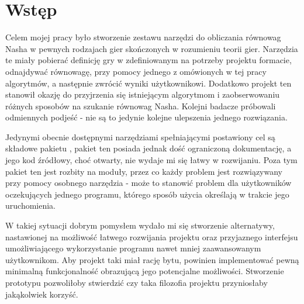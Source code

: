 \documentclass[polish]{standalone}
\begin{document}
\pagestyle{headings}

\section*{Wstęp}

Celem mojej pracy było stworzenie zestawu narzędzi do obliczania równowag Nasha w pewnych rodzajach gier skończonych
w rozumieniu teorii gier. Narzędzia te miały pobierać definicję gry w zdefiniowanym na potrzeby projektu formacie,
odnajdywać równowagę, przy pomocy jednego z omówionych w tej pracy algorytmów, a następnie zwrócić wyniki użytkownikowi.
Dodatkowo projekt ten stanowił okazję do przyjrzenia się istniejącym algorytmom i zaobserwowaniu różnych sposobów na
szukanie równowag Nasha. Kolejni badacze próbowali odmiennych podjeść - nie są to jedynie kolejne ulepszenia jednego
rozwiązania.

Jedynymi obecnie dostępnymi narzędziami spełniającymi postawiony cel są składowe pakietu , pakiet ten
posiada jednak dość ograniczoną dokumentację, a jego kod źródłowy, choć otwarty, nie wydaje mi się łatwy w rozwijaniu.
Poza tym pakiet ten jest rozbity na moduły, przez co każdy problem jest rozwiązywany przy pomocy osobnego narzędzia
- może to stanowić problem dla użytkowników oczekujących jednego programu, którego sposób użycia określają w trakcie
jego uruchomienia.

W takiej sytuacji dobrym pomysłem wydało mi się stworzenie alternatywy, nastawionej na możliwość łatwego rozwijania
projektu oraz przyjaznego interfejsu umożliwiającego wykorzystanie programu nawet mniej zaawansowanym użytkownikom. Aby
projekt taki miał rację bytu, powinien implementować pewną minimalną funkcjonalność obrazującą jego potencjalne
możliwości. Stworzenie prototypu pozwoliłoby stwierdzić czy taka filozofia projektu przyniosłaby jakąkolwiek korzyść.
\end{document}
